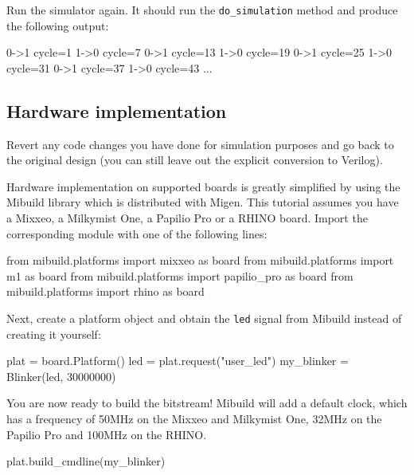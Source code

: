 \documentclass[11pt]{paper}
\begin{document}
Run the simulator again. It should run the \verb!do_simulation! method and produce the following output:
\begin{verbatimtab}
0->1 cycle=1
1->0 cycle=7
0->1 cycle=13
1->0 cycle=19
0->1 cycle=25
1->0 cycle=31
0->1 cycle=37
1->0 cycle=43
...
\end{verbatimtab}


\subsection{Hardware implementation}
Revert any code changes you have done for simulation purposes and go back to the original design (you can still leave out the explicit conversion to Verilog).

Hardware implementation on supported boards is greatly simplified by using the Mibuild library which is distributed with Migen. This tutorial assumes you have a Mixxeo, a Milkymist One, a Papilio Pro or a RHINO board. Import the corresponding module with one of the following lines:

\begin{verbatimtab}
from mibuild.platforms import mixxeo as board
from mibuild.platforms import m1 as board
from mibuild.platforms import papilio_pro as board
from mibuild.platforms import rhino as board
\end{verbatimtab}


Next, create a platform object and obtain the \verb!led! signal from Mibuild instead of creating it yourself:
\begin{verbatimtab}
plat = board.Platform()
led = plat.request("user_led")
my_blinker = Blinker(led, 30000000)
\end{verbatimtab}

You are now ready to build the bitstream! Mibuild will add a default clock, which has a frequency of 50MHz on the Mixxeo and Milkymist One, 32MHz on the Papilio Pro and 100MHz on the RHINO.
\begin{verbatimtab}
plat.build_cmdline(my_blinker)
\end{verbatimtab}
\end{document}
